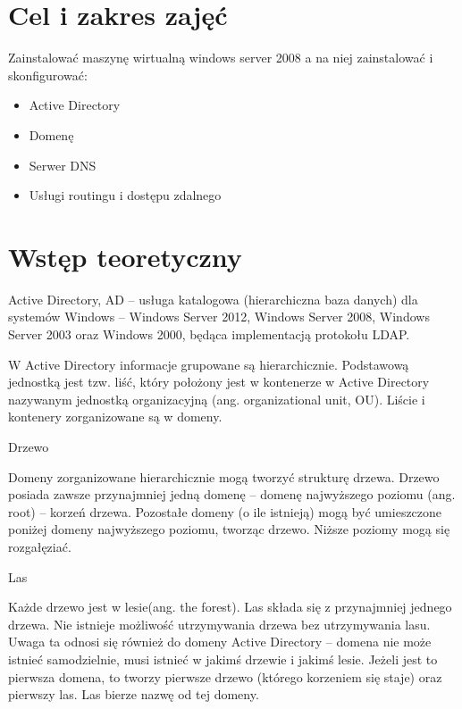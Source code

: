 \documentclass[a4paper,twoside,12pt]{mgr}
\begin{document}
\stronaTytulowa

\tableofcontents
\chapter{Cel i zakres zajęć}
Zainstalować maszynę wirtualną windows server 2008 a na niej zainstalować i skonfigurować:
\begin{itemize}
\item Active Directory
\item Domenę
\item Serwer DNS
\item Usługi routingu i dostępu zdalnego
\end{itemize}

\chapter{Wstęp teoretyczny}
Active Directory, AD – usługa katalogowa (hierarchiczna baza danych) dla systemów Windows – Windows Server 2012, Windows Server 2008, Windows Server 2003 oraz Windows 2000, będąca implementacją protokołu LDAP.

W Active Directory informacje grupowane są hierarchicznie. Podstawową jednostką jest tzw. liść, który położony jest w kontenerze w Active Directory nazywanym jednostką organizacyjną (ang. organizational unit, OU). Liście i kontenery zorganizowane są w domeny.

Drzewo

Domeny zorganizowane hierarchicznie mogą tworzyć strukturę drzewa. Drzewo posiada zawsze przynajmniej jedną domenę – domenę najwyższego poziomu (ang. root) – korzeń drzewa. Pozostałe domeny (o ile istnieją) mogą być umieszczone poniżej domeny najwyższego poziomu, tworząc drzewo. Niższe poziomy mogą się rozgałęziać.

Las

Każde drzewo jest w lesie(ang. the forest). Las składa się z przynajmniej jednego drzewa. Nie istnieje możliwość utrzymywania drzewa bez utrzymywania lasu. Uwaga ta odnosi się również do domeny Active Directory – domena nie może istnieć samodzielnie, musi istnieć w jakimś drzewie i jakimś lesie. Jeżeli jest to pierwsza domena, to tworzy pierwsze drzewo (którego korzeniem się staje) oraz pierwszy las. Las bierze nazwę od tej domeny.
\end{document}

